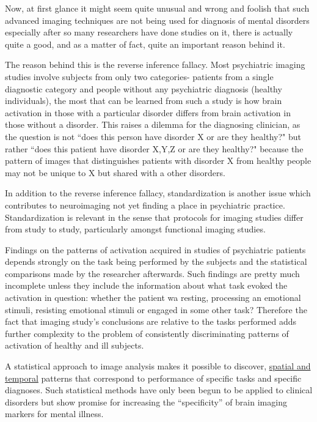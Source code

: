 \documentclass{article}
\begin{document}
Now, at first glance it might seem quite unusual and wrong and foolish
that such advanced imaging techniques are not being used for diagnosis
of mental disorders especially after so many researchers have done
studies on it, there is actually quite a good, and as a matter of
fact, quite an important reason behind it.

The reason behind this is the reverse inference fallacy. Most
psychiatric imaging studies involve subjects from only two categories-
patients from a single diagnostic category and people without any
psychiatric diagnosis (healthy individuals), the most that can be
learned from such a study is how brain activation in those with a
particular disorder differs from brain activation in those without a
disorder. This raises a dilemma for the diagnosing clinician, as the
question is not ``does this person have disorder X or are they
healthy?" but rather ``does this patient have disorder X,Y,Z or are
they healthy?" because the pattern of images that distinguishes
patients with disorder X from healthy people may not be unique to X
but shared with a other disorders.

In addition to the reverse inference fallacy, standardization is
another issue which contributes to neuroimaging not yet finding a
place in psychiatric practice. Standardization is relevant in the
sense that protocols for imaging studies differ from study to study,
particularly amongst functional imaging studies.

Findings on the patterns of activation acquired in studies of
psychiatric patients depends strongly on the task being performed by
the subjects and the statistical comparisons made by the researcher
afterwards. Such findings are pretty much incomplete unless they
include the information about what task evoked the activation in
question: whether the patient wa resting, processing an emotional
stimuli, resisting emotional stimuli or engaged in some other task?
Therefore the fact that imaging study's conclusions are relative to
the tasks performed adds further complexity to the problem of
consistently discriminating patterns of activation of healthy and ill
subjects.


A statistical approach to image analysis makes it possible to
discover, \underline{spatial and temporal} patterns that correspond to
performance of specific tasks and specific diagnoses. Such statistical
methods have only been begun to be applied to clinical disorders but
show promise for increasing the ``specificity'' of brain imaging
markers for mental illness.
\end{document}
